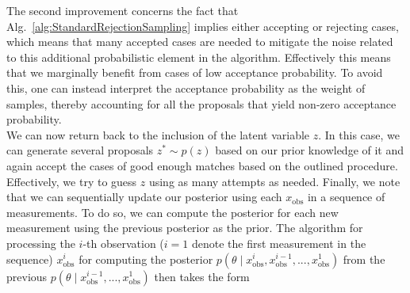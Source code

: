 \documentclass[%
 reprint,
 amsmath,amssymb,
 aps,
]{revtex4-2}
\begin{document}
The second improvement concerns the fact that Alg.~\ref{alg:StandardRejectionSampling} implies either accepting or rejecting cases, which means that many accepted cases are needed to mitigate the noise related to this additional probabilistic element in the algorithm. Effectively this means that we marginally benefit from cases of low acceptance probability. To avoid this, one can instead interpret the acceptance probability as the weight of samples, thereby accounting for all the proposals that yield non-zero acceptance probability. \\

We can now return back to the inclusion of the latent variable $z$. In this case, we can generate several proposals $z^* \sim p(z)$ based on our prior knowledge of it and again accept the cases of good enough matches based on the outlined procedure. Effectively, we try to guess $z$ using as many attempts as needed. Finally, we note that we can sequentially update our posterior using each $x_\text{obs}$ in a sequence of measurements. To do so, we can compute the posterior for each new measurement using the previous posterior as the prior. The algorithm for processing the $i$-th observation ($i=1$ denote the first measurement in the sequence) $x^i_\text{obs}$ for computing the posterior $p\left(\theta \mid x^i_\text{obs}, x^{i-1}_\text{obs}, ..., x^1_\text{obs}\right)$ from the previous $p\left(\theta \mid x^{i-1}_\text{obs}, ..., x^1_\text{obs}\right)$ then takes the form
\end{document}

